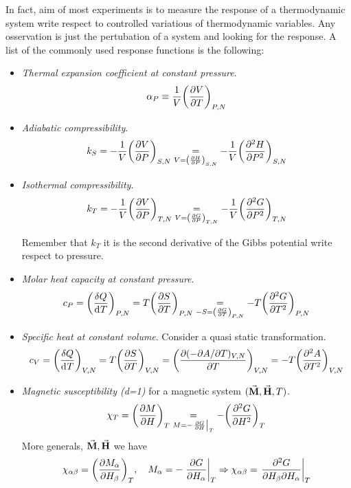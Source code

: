 \documentclass[../main/main.tex]{subfiles}
\begin{document}
In fact, aim of most experiments is to measure the response of a thermodynamic system write respect to controlled variatious of thermodynamic variables. Any osservation is just the pertubation of a system and looking for the response.
A list of the commonly used response functions is the following:
\begin{itemize}
\item \emph{Thermal expansion coefficient at constant pressure}.
\begin{equation}
  \alpha _P \equiv \frac{1}{V} \qty(\pdv{V}{T} )_{P,N}
  \label{eq:}
\end{equation}
\item \emph{Adiabatic compressibility}.
\begin{equation}
  k_S = -\frac{1}{V} \qty(\pdv{V}{P} )_{S,N} \underset{V=\qty(\pdv{H}{P} )_{S,N} }{=} - \frac{1}{V} \qty(\pdv[2]{H}{P} )_{S,N}
    \label{eq:}
\end{equation}
\item \emph{Isothermal compressibility}.
\begin{equation}
  k_T = -\frac{1}{V} \qty(\pdv{V}{P} )_{T,N} \underset{V=\qty(\pdv{G}{P} )_{T,N} }{=} - \frac{1}{V} \qty(\pdv[2]{G}{P} )_{T,N}
  \label{eq:}
\end{equation}
\begin{remark}
Remember that \( k_T \) it is the second derivative of the Gibbs potential write respect to pressure.
\end{remark}
\item \emph{Molar heat capacity at constant pressure}.
\begin{equation}
  c_P = \qty(\frac{\delta Q}{\dd[]{T} } )_{P,N} = T \qty(\pdv{S}{T} )_{P,N} \underset{-S=\qty(\pdv{G}{T} )_{P,N} }{=}  - T \qty(\pdv[2]{G}{T} )_{P,N}
  \label{eq:}
\end{equation}
\item \emph{Specific heat at constant volume}. Consider a quasi static transformation.
\begin{equation}
  c_V =  \qty(\frac{\delta Q}{\dd[]{T} } )_{V,N} = T \qty(\pdv{S}{T} )_{V,N}
      = \qty( \frac{\partial{(-\partial{A}/\partial{T} )_{V,N}} }{\partial{T} })_{V,N}
      = - T \qty(\pdv[2]{A}{T} )_{V,N}
  \label{eq:}
\end{equation}
\item \emph{Magnetic susceptibility (d=1)} for a magnetic system \( (\va{M},\va{H},T  ) \).
\begin{equation}
  \chi_T = \qty(\pdv{M}{H} )_T \underset{M = -\eval{\pdv{G}{H}}_T }{=}  - \qty(\pdv[2]{G}{H} )_T
  \label{eq:}
\end{equation}
More generals, \( \va{M},\va{H}   \) we have
\begin{equation}
  \chi _{\alpha \beta } = \qty(\pdv{M_ \alpha }{H_ \beta } )_T , \quad M_ \alpha = -\eval{\pdv{G}{H_ \alpha }}_T \Rightarrow \chi _{\alpha \beta } = \eval{\pdv{G}{H_ \beta }{H_ \alpha }}_T
  \label{eq:}
\end{equation}

\end{itemize}
\end{document}
